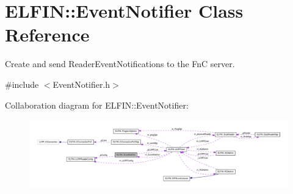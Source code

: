 \hypertarget{class_e_l_f_i_n_1_1_event_notifier}{\section{E\-L\-F\-I\-N\-:\-:Event\-Notifier Class Reference}
\label{class_e_l_f_i_n_1_1_event_notifier}
}


Create and send Reader\-Event\-Notifications to the Fn\-C server.  




{\ttfamily \#include $<$Event\-Notifier.\-h$>$}



Collaboration diagram for E\-L\-F\-I\-N\-:\-:Event\-Notifier\-:
\nopagebreak
\begin{figure}[H]
\begin{center}
\leavevmode
\includegraphics[width=350pt]{class_e_l_f_i_n_1_1_event_notifier__coll__graph}
\end{center}
\end{figure}
